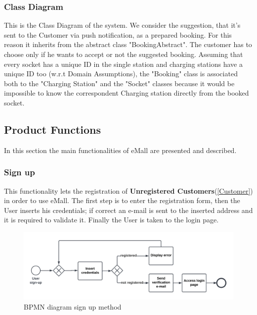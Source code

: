 \subsubsection{Class Diagram}
This is the Class Diagram of the system.
We consider the suggestion, that it's sent to the Customer via push notification, as a prepared booking. For this reason it inherits from the abstract class "BookingAbstract". The customer has to choose only if he wants to accept or not the suggested booking.
Assuming that every socket has a unique ID in the single station and charging stations have a unique ID too (w.r.t Domain Assumptions), the "Booking" class is associated both to the "Charging Station" and the "Socket" classes because it would be impossible to know the correspondent Charging station directly from the booked socket.





\subsection{Product Functions}
In this section the main functionalities of eMall are presented and described.
\subsubsection{Sign up}
This functionality lets the registration of \textbf{Unregistered Customers}(\ref{Customer}) in order to use eMall. The first step is to enter the registration form, then the User inserts his credentials; if correct an e-mail is sent to the inserted address and it is required to validate it. 
Finally the User is taken to the login page.
\begin{figure}[H]
    \begin{center}
        \includegraphics[width=\textwidth]{img/fun-sign-up.png}
        \caption{BPMN diagram sign up method}
    \end{center}
\end{figure}
